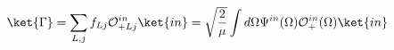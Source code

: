 \begin{equation}
\ket{\Gamma}=\sum_{L,j} f_{Lj} 
\mathcal{O}^{in}_{+Lj}
\ket{in}=\sqrt{\frac{2}{\mu}}\int d\Omega 
 \Psi^{in}(\Omega)\mathcal{O}^{in}_+(\Omega)\ket{in} \ 
\end{equation}

